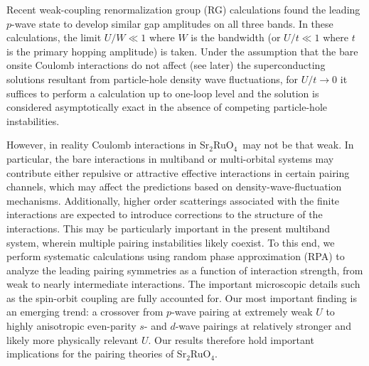 \documentclass[aps,prl,twocolumn,superscriptaddress,showpacs]{revtex4-1}
\newcommand{\ra}{\rightarrow}
\newcommand{\SRO}{Sr$_2$RuO$_4$}
\begin{document}
Recent weak-coupling renormalization group (RG) calculations \cite{Scaffidi:14,Huang:16} found the leading $p$-wave state to develop similar gap amplitudes on all three bands. In these calculations, the limit $U/W \ll 1$ where $W$ is the bandwidth (or $U/t \ll 1$ where $t$ is the primary hopping amplitude) \cite{Raghu:10a} is taken. Under the assumption that the bare onsite Coulomb interactions do not affect (see later) the superconducting solutions resultant from particle-hole density wave fluctuations, for $U/t \ra 0$ it suffices to perform a calculation up to one-loop level and the solution is considered asymptotically exact in the absence of competing particle-hole instabilities. %

However, in reality Coulomb interactions in \SRO~may not be that weak. In particular, the bare interactions in multiband or multi-orbital systems may contribute either repulsive or attractive effective interactions in certain pairing channels, which may affect the predictions based on density-wave-fluctuation mechanisms. Additionally, higher order scatterings associated with the finite interactions are expected to introduce corrections to the structure of the interactions. This may be particularly important in the present multiband system, wherein multiple pairing instabilities likely coexist. To this end, we perform systematic calculations using random phase approximation (RPA) to analyze the leading pairing symmetries as a function of interaction strength, from weak to nearly intermediate interactions. The important microscopic details such as the spin-orbit coupling are fully accounted for. %
Our most important finding is an emerging trend: a crossover from $p$-wave pairing at extremely weak $U$ to highly anisotropic even-parity $s$- and $d$-wave pairings at relatively stronger and likely more physically relevant $U$. Our results therefore hold important implications for the pairing theories of \SRO.


\end{document}
